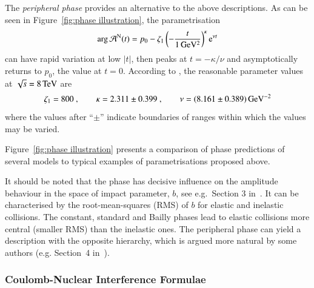 The {\it peripheral phase} \cite{kl94} provides an alternative to the above descriptions. As can be seen in Figure~\ref{fig:phase illustration}, the parametrisation
\begin{equation}
\label{eq:nuc phase per}
\arg {\cal A}^{\rm N}(t) = p_0 - \zeta_1 \left(- {t\over 1\un{GeV^2}} \right)^\kappa \e^{\nu t}
\end{equation}
can have rapid variation at low $|t|$, then peaks at $t = -\kappa / \nu$ and asymptotically returns to $p_0$, the value at $t=0$. According to \cite{kl-8tev}, the reasonable parameter values at $\sqrt s = 8\,{\rm TeV}$ are
\begin{equation}
\label{eq:nuc phase per val}
	\zeta_1 = 800\ ,\qquad
	\kappa = 2.311 \pm 0.399\ ,\qquad
	\nu = (8.161 \pm 0.389)\,{\rm GeV^{-2}}
\end{equation}
where the values after ``$\pm$'' indicate boundaries of ranges within which the values may be varied.


Figure~\ref{fig:phase illustration} presents a comparison of phase predictions of several models to typical examples of parametrisations proposed above.

It should be noted that the phase has decisive influence on the amplitude behaviour in the space of impact parameter, $b$, see e.g.~Section 3 in~\cite{klk02}. It can be characterised by the root-mean-squares (RMS) of $b$ for elastic and inelastic collisions. The constant, standard and Bailly phases lead to elastic collisions more central (smaller RMS) than the inelastic ones. The peripheral phase can yield a description with the opposite hierarchy, which is argued more natural by some authors (e.g. Section~4 in~\cite{kl96}). 

\subsubsection{Coulomb-Nuclear Interference Formulae}
\label{sec:cni interference}

